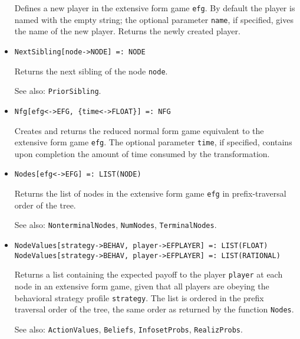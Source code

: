 \begin{itemize}
\bd
Defines a new player in the extensive form game \verb+efg+.
By default the player is named with the empty string; the optional parameter
\verb+name+, if specified, gives the name of the new player.  Returns the
newly created player.
\ed

\item
\protect \large \begin{verbatim}
NextSibling[node->NODE] =: NODE
\end{verbatim}\normalsize

\bd
Returns the next sibling of the node \verb+node+.
\item
[See also:] {\tt PriorSibling}.
\ed

\item
\protect \large \begin{verbatim}
Nfg[efg<->EFG, {time<->FLOAT}] =: NFG
\end{verbatim}\normalsize

\bd
Creates and returns the reduced normal form game equivalent
to the extensive form game \verb+efg+.  The optional parameter \verb+time+,
if specified, contains upon completion the amount of time consumed by
the transformation.
\ed

\item
\protect \large \begin{verbatim} 
Nodes[efg<->EFG] =: LIST(NODE)
\end{verbatim}\normalsize

\bd
Returns the list of nodes in the extensive form game
\verb+efg+ in prefix-traversal order of the tree.
\item
[See also:] {\tt NonterminalNodes}, {\tt NumNodes}, {\tt TerminalNodes}.
\ed

\item
\protect \large \begin{verbatim}
NodeValues[strategy->BEHAV, player->EFPLAYER] =: LIST(FLOAT)
NodeValues[strategy->BEHAV, player->EFPLAYER] =: LIST(RATIONAL)
\end{verbatim}\normalsize

\bd
Returns a list containing the expected payoff to the player \verb+player+
at each node in an extensive form game, given that all players are obeying
the behavioral strategy profile \verb+strategy+.  The list is ordered
in the prefix traversal order of the tree, the same order as returned
by the function {\tt Nodes}.
\item
[See also:] {\tt ActionValues}, {\tt Beliefs}, {\tt InfosetProbs},
{\tt RealizProbs}.
\ed


\end{itemize}
